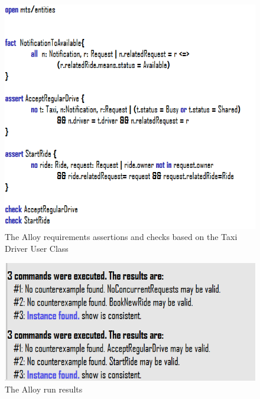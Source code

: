\documentclass{article}
\begin{document}
\begin{figure}[h!]
        \centering
        \includegraphics[width=1\columnwidth]{alloy/UC-TaxiDriver}
        \caption{The Alloy requirements assertions and checks based on the Taxi Driver User Class}
        \label{fig:alloy-taxidriver}
    \end{figure}
    
\begin{figure}[h!]
        \centering
        \includegraphics[width=1\columnwidth]{alloy/execution}
        \caption{The Alloy run results}
        \label{fig:alloy-execution}
    \end{figure}
    
\clearpage
\end{document}

